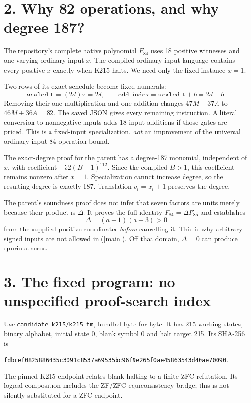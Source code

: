 \documentclass[10pt]{article}
\newcommand{\code}[1]{\texttt{#1}}
\begin{document}
\section*{2. Why 82 operations, and why degree 187?}
The repository's complete native polynomial $F_{84}$ uses 18 positive witnesses and one varying ordinary input $x$. The compiled ordinary-input language contains every positive $x$ exactly when K215 halts. We need only the fixed instance $x=1$.

Two rows of its exact schedule become fixed numerals:
\[
\code{scaled\_t}=(2d)x=2d,\qquad
\code{odd\_index}=\code{scaled\_t}+b=2d+b.
\]
Removing their one multiplication and one addition changes $47M+37A$ to
\textbf{$46M+36A=82$}. The saved JSON gives every remaining instruction. A literal conversion to nonnegative inputs adds 18 input additions if those gates are priced. This is a fixed-input specialization, \emph{not} an improvement of the universal ordinary-input 84-operation bound.

The exact-degree proof for the parent has a degree-187 monomial, independent of $x$, with coefficient $-32(B-1)^{112}$. Since the compiled $B>1$, this coefficient remains nonzero after $x=1$. Specialization cannot increase degree, so the resulting degree is exactly 187. Translation $v_i=x_i+1$ preserves the degree.

The parent's soundness proof does not infer that seven factors are units merely because their product is $\Delta$. It proves the full identity $F_{84}=\Delta F_{85}$ and establishes
\[
\Delta=(a+1)(a+3)>0
\]
from the supplied positive coordinates \emph{before} cancelling it. This is why arbitrary signed inputs are not allowed in (\ref{main}). Off that domain, $\Delta=0$ can produce spurious zeros.
\newpage
\section*{3. The fixed program: no unspecified proof-search index}
Use \code{candidate-k215/k215.tm}, bundled byte-for-byte. It has 215 working states, binary alphabet, initial state 0, blank symbol 0 and halt target 215. Its SHA-256 is
\begin{center}\small\code{fdbcef0825886035c3091c8537a69535bc96f9e265f0ae45863543d40ae70090}.\end{center}
The pinned K215 endpoint relates blank halting to a finite ZFC refutation. Its logical composition includes the ZF/ZFC equiconsistency bridge; this is not silently substituted for a ZFC endpoint.
\end{document}
